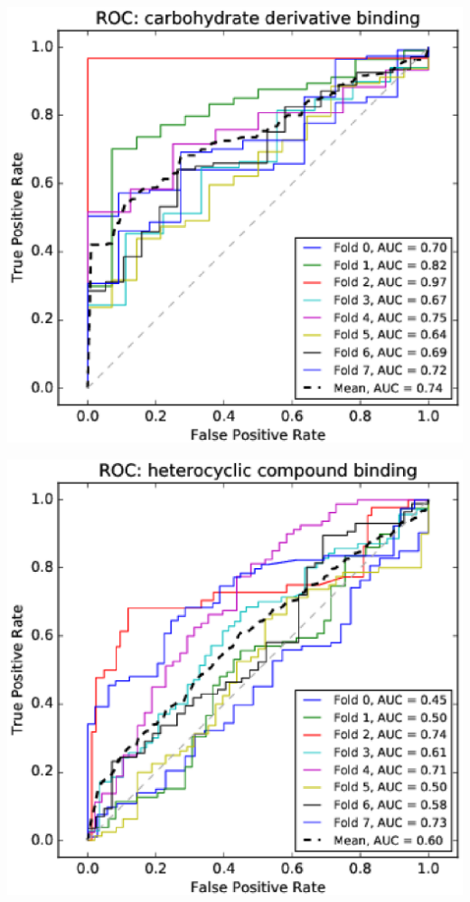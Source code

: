 \documentclass[11pt,twoside,a4paper]{book}
\newenvironment{Figure}
  {\par\medskip\noindent\minipage{\linewidth}}
  {\endminipage\par\medskip}
\begin{document}
\begin{multicols}{2}
\begin{Figure}\begin{center}\includegraphics[width=\linewidth]{figures/roc_carbohydrate_derivative_binding}\label{fig:roc_carbohydrate_derivative_binding}\end{center}\end{Figure}
\begin{Figure}\begin{center}\includegraphics[width=\linewidth]{figures/roc_heterocyclic_compound_binding}\label{fig:roc_heterocyclic_compound_binding}\end{center}\end{Figure}

\end{multicols}
\end{document}
